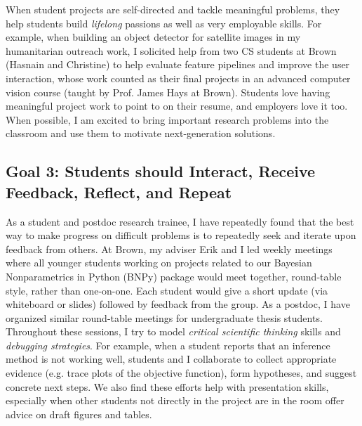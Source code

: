 \documentclass[11pt,letterpaper]{article}
\begin{document}
When student projects are self-directed and tackle meaningful problems, they help students build \emph{lifelong} passions as well as very employable skills. For example, when building an object detector for satellite images in my humanitarian outreach work, I solicited help from two CS students at Brown (Hasnain and Christine) to help evaluate feature pipelines and improve the user interaction, whose work counted as their final projects in an advanced computer vision course (taught by Prof. James Hays at Brown). 
Students love having meaningful project work to point to on their resume, and employers love it too.
When possible, I am excited to bring important research problems into the classroom and use them to motivate next-generation solutions. 

\subsection*{Goal 3: Students should Interact, Receive Feedback, Reflect, and Repeat}

As a student and postdoc research trainee, I have repeatedly found that the best way to make progress on difficult problems is to repeatedly seek and iterate upon feedback from others. At Brown, my adviser Erik and I led weekly meetings where all younger students working on projects related to our Bayesian Nonparametrics in Python (BNPy) package would meet together, round-table style, rather than one-on-one. Each student would give a short update (via whiteboard or slides) followed by feedback from the group. 
As a postdoc, I have organized similar round-table meetings for undergraduate thesis students.
Throughout these sessions, I try to model \emph{critical scientific thinking} skills and \emph{debugging strategies}.
For example, when a student reports that an inference method is not working well, students and I collaborate to collect appropriate evidence (e.g. trace plots of the objective function), form hypotheses, and suggest concrete next steps.
We also find these efforts help with presentation skills, especially when other students not directly in the project are in the room offer advice on draft figures and tables.
\end{document}
